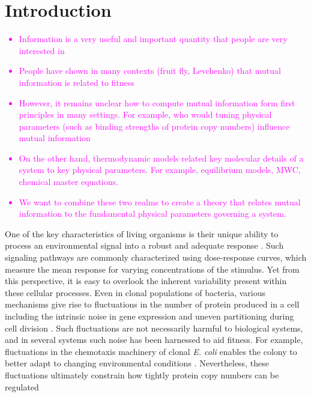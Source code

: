 \section{Introduction}

\textcolor{magenta}{
\begin{itemize}
	\item Information is a very useful and important quantity that people are very interested in
	\item People have shown in many contexts (fruit fly, Levchenko) that mutual information is related to fitness
	\item However, it remains unclear how to compute mutual information form first principles in many settings. For example, who would tuning physical parameters (such as binding strengths of protein copy numbers) influence mutual information
	\item On the other hand, thermodynamic models related key molecular details of a system to key physical parameters. For example, equilibrium models, MWC, chemical master equations. 	
	\item We want to combine these two realms to create a theory that relates mutual information to the fundamental physical parameters governing a system.
\end{itemize}
}

One of the key characteristics of living organisms is their unique ability to
process an environmental signal into a robust and adequate response
\cite{Nemenman2010}. Such signaling pathways are commonly characterized using
dose-response curves, which measure the mean response for varying concentrations
of the stimulus. Yet from this perspective, it is easy to overlook the inherent
variability present within these cellular processes. %
Even in clonal populations of bacteria, various mechanisms give rise to
fluctuations in the number of protein produced in a cell including the intrinsic
noise in gene expression \cite{Elowitz2002} and uneven partitioning during cell
division \cite{Huh2011}. Such fluctuations are not necessarily harmful to
biological systems, and in several systems such noise has been harnessed to aid
fitness. For example, fluctuations in the chemotaxis machinery of clonal
\textit{E. coli} enables the colony to better adapt to changing environmental
conditions \cite{Frankel2014}. Nevertheless, these fluctuations ultimately
constrain how tightly protein copy numbers can be regulated \cite{Lestas2010}

